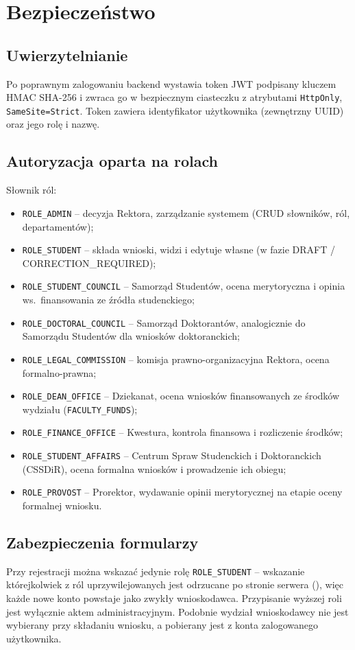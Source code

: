 \documentclass[12pt,a4paper]{article}
\begin{document}
\section{Bezpieczeństwo}
\label{sec:bezp}

\subsection{Uwierzytelnianie}
Po poprawnym zalogowaniu backend wystawia token JWT podpisany kluczem HMAC SHA-256
i zwraca go w bezpiecznym ciasteczku z atrybutami \texttt{HttpOnly}, \texttt{SameSite=Strict}.
Token zawiera identyfikator użytkownika (zewnętrzny UUID) oraz jego rolę i nazwę.

\subsection{Autoryzacja oparta na rolach}
Słownik ról:
\begin{itemize}[leftmargin=*]
  \item \texttt{ROLE\_ADMIN} -- decyzja Rektora, zarządzanie systemem (CRUD słowników, ról, departamentów);
  \item \texttt{ROLE\_STUDENT} -- składa wnioski, widzi i edytuje własne (w fazie DRAFT / CORRECTION\_REQUIRED);
  \item \texttt{ROLE\_STUDENT\_COUNCIL} -- Samorząd Studentów, ocena merytoryczna i opinia ws.\ finansowania ze źródła studenckiego;
  \item \texttt{ROLE\_DOCTORAL\_COUNCIL} -- Samorząd Doktorantów, analogicznie do Samorządu Studentów dla wniosków doktoranckich;
  \item \texttt{ROLE\_LEGAL\_COMMISSION} -- komisja prawno-organizacyjna Rektora, ocena formalno-prawna;
  \item \texttt{ROLE\_DEAN\_OFFICE} -- Dziekanat, ocena wniosków finansowanych ze środków wydziału (\texttt{FACULTY\_FUNDS});
  \item \texttt{ROLE\_FINANCE\_OFFICE} -- Kwestura, kontrola finansowa i rozliczenie środków;
  \item \texttt{ROLE\_STUDENT\_AFFAIRS} -- Centrum Spraw Studenckich i Doktoranckich (CSSDiR), ocena formalna wniosków i prowadzenie ich obiegu;
  \item \texttt{ROLE\_PROVOST} -- Prorektor, wydawanie opinii merytorycznej na etapie oceny formalnej wniosku.
\end{itemize}

\subsection{Zabezpieczenia formularzy}
Przy rejestracji można wskazać jedynie rolę \texttt{ROLE\_STUDENT} -- wskazanie
którejkolwiek z ról uprzywilejowanych jest odrzucane po stronie serwera
(\texttt{}), więc każde nowe konto powstaje jako
zwykły wnioskodawca. Przypisanie wyższej roli jest wyłącznie aktem administracyjnym.
Podobnie wydział wnioskodawcy nie jest wybierany przy składaniu wniosku, a
pobierany jest z konta zalogowanego użytkownika.
\end{document}
